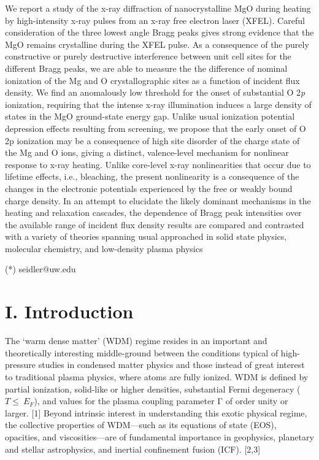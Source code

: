 \begin{addmargin}[4em]{1em}
We report a study of the x-ray diffraction of nanocrystalline MgO during
heating by high-intensity x-ray pulses from an x-ray free electron laser
(XFEL). Careful consideration of the three lowest angle Bragg peaks
gives strong evidence that the MgO remains crystalline during the XFEL
pulse. As a consequence of the purely constructive or purely destructive
interference between unit cell sites for the different Bragg peaks, we
are able to measure the the difference of nominal ionization of the Mg
and O crystallographic sites as a function of incident flux density. We
find an anomalously low threshold for the onset of substantial O
2\emph{p} ionization, requiring that the intense x-ray illumination
induces a large density of states in the MgO ground-state energy gap.
Unlike usual ionization potential depression effects resulting from
screening, we propose that the early onset of O 2p ionization may be a
consequence of high site disorder of the charge state of the Mg and O
ions, giving a distinct, valence-level mechanism for nonlinear response
to x-ray heating. Unlike core-level x-ray nonlinearities that occur due
to lifetime effects, i.e., bleaching, the present nonlinearity is a
consequence of the changes in the electronic potentials experienced by
the free or weakly bound charge density. In an attempt to elucidate the
likely dominant mechanisms in the heating and relaxation cascades, the
dependence of Bragg peak intensities over the available range of
incident flux density results are compared and contrasted with a variety
of theories spanning usual approached in solid state physics, molecular
chemistry, and low-density plasma physics
\end{addmargin}

(*) seidler@uw.edu

\section{I. Introduction}

The `warm dense matter' (WDM) regime resides in an important and
theoretically interesting middle-ground between the conditions typical
of high-pressure studies in condensed matter physics and those instead
of great interest to traditional plasma physics, where atoms are fully
ionized. WDM is defined by partial ionization, solid-like or higher
densities, substantial Fermi degeneracy (\(T \leq \ E_{F}\)), and values
for the plasma coupling parameter Γ of order unity or larger. {[}1{]}
Beyond intrinsic interest in understanding this exotic physical regime,
the collective properties of WDM---such as its equations of state (EOS),
opacities, and viscosities---are of fundamental importance in
geophysics, planetary and stellar astrophysics, and inertial confinement
fusion (ICF). {[}2,3{]}

